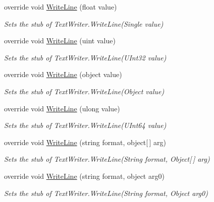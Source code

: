 \begin{DoxyCompactItemize}
override void \hyperlink{class_system_1_1_i_o_1_1_fakes_1_1_stub_stream_writer_a428ae2fb44abd7ed5ad3319c7038b196}{Write\-Line} (float value)
\begin{DoxyCompactList}\small\item\em Sets the stub of Text\-Writer.\-Write\-Line(\-Single value)\end{DoxyCompactList}\item 
override void \hyperlink{class_system_1_1_i_o_1_1_fakes_1_1_stub_stream_writer_ac12f968a932432fa8f4d4906bddfa291}{Write\-Line} (uint value)
\begin{DoxyCompactList}\small\item\em Sets the stub of Text\-Writer.\-Write\-Line(\-U\-Int32 value)\end{DoxyCompactList}\item 
override void \hyperlink{class_system_1_1_i_o_1_1_fakes_1_1_stub_stream_writer_ad20d0f31fbaa33083da3aa67f49083f6}{Write\-Line} (object value)
\begin{DoxyCompactList}\small\item\em Sets the stub of Text\-Writer.\-Write\-Line(\-Object value)\end{DoxyCompactList}\item 
override void \hyperlink{class_system_1_1_i_o_1_1_fakes_1_1_stub_stream_writer_a083ce6eeaf71155451e870b79d1d35ca}{Write\-Line} (ulong value)
\begin{DoxyCompactList}\small\item\em Sets the stub of Text\-Writer.\-Write\-Line(\-U\-Int64 value)\end{DoxyCompactList}\item 
override void \hyperlink{class_system_1_1_i_o_1_1_fakes_1_1_stub_stream_writer_a59ea36b79dfcf06a44c2fa7394b11df5}{Write\-Line} (string format, object\mbox{[}$\,$\mbox{]} arg)
\begin{DoxyCompactList}\small\item\em Sets the stub of Text\-Writer.\-Write\-Line(\-String format, Object\mbox{[}$\,$\mbox{]} arg)\end{DoxyCompactList}\item 
override void \hyperlink{class_system_1_1_i_o_1_1_fakes_1_1_stub_stream_writer_a645207a41ed35fc2e1127cfe2c83f384}{Write\-Line} (string format, object arg0)
\begin{DoxyCompactList}\small\item\em Sets the stub of Text\-Writer.\-Write\-Line(\-String format, Object arg0)\end{DoxyCompactList}\item 

\end{DoxyCompactItemize}
